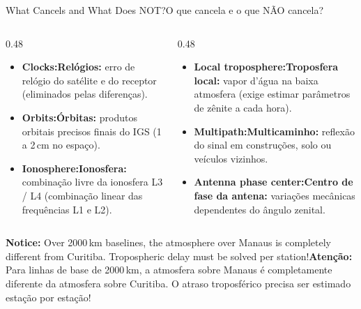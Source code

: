 \documentclass[aspectratio=169,11pt]{beamer}
\newcommand{\tr}[2]{\ifEN#2\else#1\fi}
\begin{document}
\begin{frame}{\tr{O que cancela e o que NÃO cancela?}{What Cancels and What Does NOT?}}
  \begin{columns}[onlytextwidth]
    \begin{column}{0.48\textwidth}
      \begin{tcolorbox}[colback=mTeal!8, colframe=mTeal, title={\tr{O que se cancela / modela}{What cancels / is modeled}}]
        \scriptsize
        \begin{itemize}
          \setlength{\itemsep}{2pt}
          \item \textbf{\tr{Relógios:}{Clocks:}} erro de relógio do satélite e do receptor (eliminados pelas diferenças).
          \item \textbf{\tr{Órbitas:}{Orbits:}} produtos orbitais precisos finais do IGS (\num{1} a \num{2}\,cm no espaço).
          \item \textbf{\tr{Ionosfera:}{Ionosphere:}} combinação livre da ionosfera L3 / L4 (combinação linear das frequências L1 e L2).
        \end{itemize}
      \end{tcolorbox}
    \end{column}
    \begin{column}{0.48\textwidth}
      \begin{tcolorbox}[colback=mRose!8, colframe=mRose, title={\tr{O que não se cancela}{What does not cancel}}]
        \scriptsize
        \begin{itemize}
          \setlength{\itemsep}{2pt}
          \item \textbf{\tr{Troposfera local:}{Local troposphere:}} vapor d'água na baixa atmosfera (exige estimar parâmetros de zênite a cada hora).
          \item \textbf{\tr{Multicaminho:}{Multipath:}} reflexão do sinal em construções, solo ou veículos vizinhos.
          \item \textbf{\tr{Centro de fase da antena:}{Antenna phase center:}} variações mecânicas dependentes do ângulo zenital.
        \end{itemize}
      \end{tcolorbox}
    \end{column}
  \end{columns}
  \vspace{0.25cm}
  \begin{cuidado}
    \scriptsize \tr{\textbf{Atenção:} Para linhas de base de \num{2000}\,km, a atmosfera sobre Manaus
    é completamente diferente da atmosfera sobre Curitiba. O atraso troposférico precisa ser
    estimado estação por estação!}{\textbf{Notice:} Over \num{2000}\,km baselines, the atmosphere
    over Manaus is completely different from Curitiba. Tropospheric delay must be solved per station!}
  \end{cuidado}
\end{frame}
\end{document}
